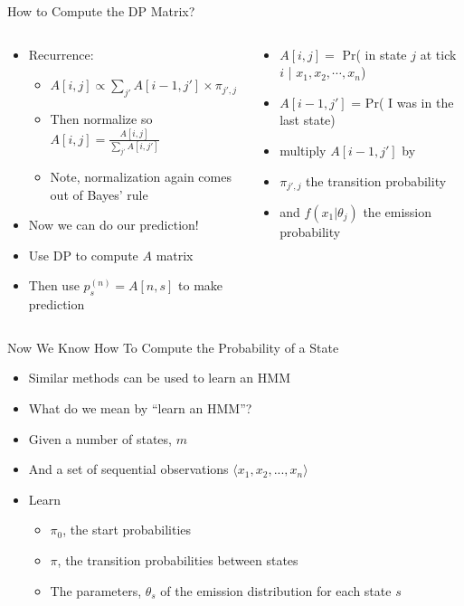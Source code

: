 \documentclass[aspectratio=169]{beamer}
\begin{document}
\begin{frame}{How to Compute the DP Matrix?}

\begin{columns}[T]
\begin{column}{0.5\textwidth}
\begin{itemize}
\item Recurrence:
	\begin{itemize}
	\item $A[i,j] \propto \sum_{j'} A[i-1,j'] \times \pi_{j',j} \times f (x_1 | \theta_j)$
	\item Then normalize so $A[i,j] = \frac{A[i,j]}{\sum_{j'} A[i,j']}$
	\item Note, normalization again comes out of Bayes' rule
	\end{itemize}
\item Now we can do our prediction!
\item Use DP to compute $A$ matrix
\item Then use $p^{(n)}_s = A[n,s]$ to make prediction
\end{itemize}
\end{column}
\begin{column}{0.5\textwidth}
	\begin{itemize}
	\item $A[i,j] = $ Pr( in state $j$ at tick $i$ | $x_1, x_2, \cdots, x_n$) 
	\item $A[i-1,j']$ = Pr( I was in the last state) 
	\item multiply $A[i-1,j']$ by 
	\item $\pi_{j',j}$ the transition probability
	\item and $f (x_1 | \theta_j)$ the emission probability
	\end{itemize}
\end{column}
\end{columns}
\end{frame}

\begin{frame}{Now We Know How To Compute the Probability of a State}

\begin{itemize}
\item Similar methods can be used to learn an HMM
\item What do we mean by ``learn an HMM''?
\item Given a number of states, $m$
\item And a set of sequential observations $\langle x_1, x_2, ..., x_n \rangle$
\item Learn 
\begin{itemize}
\item $\pi_0$, the start probabilities
\item $\pi$, the transition probabilities between states
\item The parameters, $\theta_s$ of the emission distribution for each state $s$ 
\end{itemize}
\end{itemize}
\end{frame}
\end{document}
